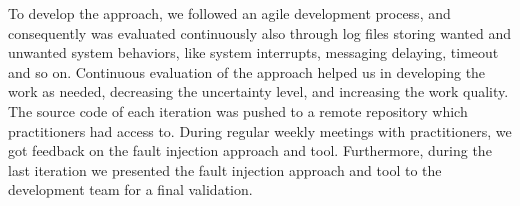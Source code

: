 
To develop the approach, we followed an agile development process, and consequently \approach{} was evaluated continuously also through log files storing wanted and unwanted system behaviors, like system interrupts, messaging delaying, timeout and so on. Continuous evaluation of the approach helped us in developing the work as needed, decreasing the uncertainty level, and increasing the work quality. The source code of each iteration was pushed to a remote repository which practitioners had access to. During regular weekly meetings with practitioners, we got feedback on the fault injection approach and tool. Furthermore, during the last iteration we presented the fault injection approach and tool to the development team for a final validation.


%

